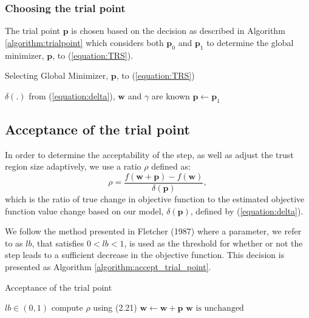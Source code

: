 \documentclass[letterpaper,12pt,titlepage,oneside,final]{book}
\begin{document}
	\subsubsection{Choosing the trial point}
	
	The trial point $\mathbf{p}$ is chosen based on the decision as described in Algorithm \ref{algorithm:trialpoint} which considers both $\mathbf{p}_{0}$ and $\mathbf{p}_{1}$ to determine the global minimizer, $\mathbf{p}$, to (\ref{equation:TRS}).
	\begin{algorithm}
		\caption{Selecting Global Minimizer, $\mathbf{p}$, to (\ref{equation:TRS})}\label{algorithm:trialpoint}
		\begin{algorithmic}[1]
			\State $\delta(.)$ from (\ref{equation:delta}), $\mathbf{w}$ and $\gamma$ are known
			\Else {}
			\State $\mathbf{p} \gets \mathbf{p}_{1}$
			\EndIf 
		\end{algorithmic}
	\end{algorithm}
	
	\subsection{Acceptance of the trial point}
	
	In order to determine the acceptability of the step, as well as adjust the trust region size adaptively, we use a ratio $\rho$ defined as:
	\begin{equation}
	\rho = \frac{f(\mathbf{w} + \mathbf{p}) - f(\mathbf{w})}{\delta(\mathbf{p})},
	\label{equation:rho}
	\end{equation}
	which is the ratio of true change in objective function to the estimated objective function value change based on our model, $\delta(\mathbf{p})$, defined by (\ref{equation:delta}). 
	
	We follow the method presented in Fletcher (1987) \cite{Fletcher.1987} where a parameter, we refer to as $lb$, that satisfies $0 < lb < 1$, is used as the threshold for whether or not the step leads to a sufficient decrease in the objective function. This decision is presented as Algorithm \ref{algorithm:accept_trial_point}.
	
	\begin{algorithm}
		\caption{Acceptance of the trial point \cite{Fletcher.1987}}\label{algorithm:accept_trial_point}
		\begin{algorithmic}[1]
			\State $lb \in (0,1)$
			\State compute $\rho$ using (2.21)
			\If{$\rho \geq lb$}
			\State $\mathbf{w} \gets \mathbf{w} + \mathbf{p}$
			\Else
			\State $\mathbf{w} \text{ is unchanged}$
			\EndIf
		\end{algorithmic}
	\end{algorithm}
	
\end{document}

